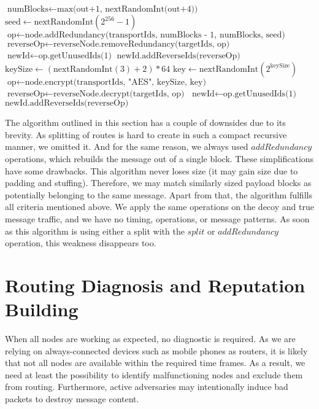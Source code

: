 \begin{breakablealgorithm}
\begin{algorithmic}[1]
				\State $\text{numBlocks} \gets \text{max(out+1, nextRandomInt(out+4))}$
				\State $\text{seed} \gets \text{nextRandomInt}(2^{256}-1)$
				\State $\text{op} \gets \text{node.addRedundancy(transportIds, numBlocks - 1, numBlocks, seed)}$
					\State $\text{reverseOp} \gets \text{reverseNode.removeRedundancy(targetIds, op)}$
					\State $\text{newId} \gets \text{op.getUnusedIds(1)}$
					\State $\text{newId.addReverseIds(reverseOp)}$
				\EndIf	
			\Else
				\State $\text{keySize}   \gets (\text{nextRandomInt}(3)+2)*64$
				\State $\text{key}       \gets \text{nextRandomInt}(2^{\text{keySize}})$
				\State $\text{op}        \gets \text{node.encrypt(transportIds, "AES", keySize, key)}$
					\State $\text{reverseOp} \gets \text{reverseNode.decrypt(targetIds, op)}$
					\State $\text{newId}     \gets \text{op.getUnusedIds(1)}$
					\State $\text{newId.addReverseIds(reverseOp)}$
				\EndIf	
			\EndIf
		\EndFunction\label{alg:endAssignOperation-line}
	\end{algorithmic}
\end{breakablealgorithm}


The algorithm outlined in this section has a couple of downsides due to its brevity. As splitting of routes is hard to create in such a compact recursive manner, we omitted it. And for the same reason, we always used $addRedundancy$ operations, which rebuilds the message out of a single block. These simplifications have some drawbacks. This algorithm never loses size (it may gain size due to padding and stuffing). Therefore, we may match similarly sized payload blocks as potentially belonging to the same message. Apart from that, the algorithm fulfills all criteria mentioned above. We apply the same operations on the decoy and true message traffic, and we have no timing, operations, or message patterns. As soon as this algorithm is using either a split with the $split$ or $addRedundancy$ operation, this weakness disappears too.

\section{Routing Diagnosis and Reputation Building\label{sec:diagnosisOfMessagePath}}
When all nodes are working as expected, no diagnostic is required. As we are relying on always-connected devices such as mobile phones as routers, it is likely that not all nodes are available within the required time frames. As a result, we need at least the possibility to identify malfunctioning nodes and exclude them from routing. Furthermore, active adversaries may intentionally induce bad packets to destroy message content.

